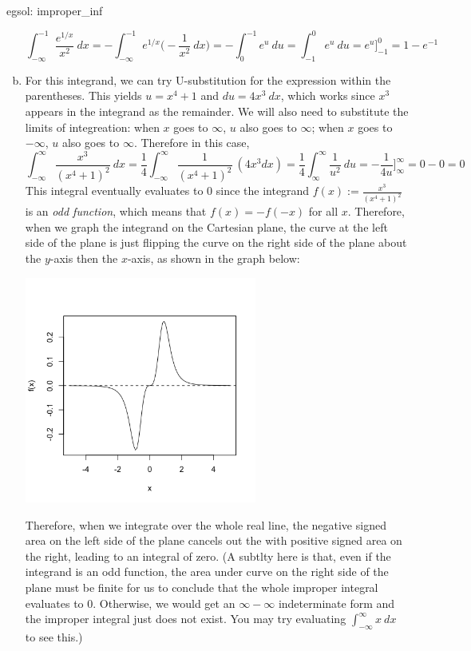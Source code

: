 \begin{egsol}[]{egsol: improper_inf}
\begin{enumerate}[a)]
        \[\int_{-\infty}^{-1} \frac{e^{1/x}}{x^2}~dx = -\int_{-\infty}^{-1} e^{1/x}\Big(-\frac{1}{x^2}~dx\Big) = -\int_{0}^{-1} e^u~du = \int_{-1}^0 e^u~du = e^u\Big]_{-1}^0 = 1 - e^{-1}\]
        \item For this integrand, we can try U-substitution for the expression within the parentheses.  This yields $u = x^4+1$ and $du = 4x^3~dx$, which works since $x^3$ appears in the integrand as the remainder.  We will also need to substitute the limits of integreation: when $x$ goes to $\infty$, $u$ also goes to $\infty$; when $x$ goes to $-\infty$, $u$ also goes to $\infty$.  Therefore in this case,
        \[\int_{-\infty}^{\infty} \frac{x^3}{(x^4+1)^2}~dx = \frac{1}{4}\int_{-\infty}^{\infty} \frac{1}{(x^4+1)^2}~(4x^3dx) = \frac{1}{4}\int_{\infty}^{\infty}\frac{1}{u^2}~du = -\frac{1}{4u}\Big]_{\infty}^{\infty} = 0 - 0 = 0\]
        This integral eventually evaluates to $0$ since the integrand $f(x) := \frac{x^3}{(x^4+1)^2}$ is an \textit{odd function}, which means that $f(x) = -f(-x)$ for all $x$.  Therefore, when we graph the integrand on the Cartesian plane, the curve at the left side of the plane is just flipping the curve on the right side of the plane about the $y$-axis then the $x$-axis, as shown in the graph below: 
        \begin{center}
            \includegraphics[trim = {0 0 0 2cm}, clip, width = 0.6\textwidth]{figures/chap 07/odd_function.png}
        \end{center}
        Therefore, when we integrate over the whole real line, the negative signed area on the left side of the plane cancels out the with positive signed area on the right, leading to an integral of zero.  (A subtlty here is that, even if the integrand is an odd function, the area under curve on the right side of the plane must be finite for us to conclude that the whole improper integral evaluates to $0$.  Otherwise, we would get an $\infty - \infty$ indeterminate form and the improper integral just does not exist.  You may try evaluating $\int_{-\infty}^{\infty} x~dx$ to see this.)
    \end{enumerate}
\end{egsol}

